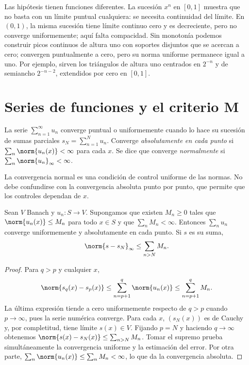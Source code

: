 Las hipótesis tienen funciones diferentes. La sucesión $x^n$ en $[0,1]$ muestra que no basta con un límite puntual cualquiera: se necesita continuidad del límite. En $(0,1)$, la misma sucesión tiene límite continuo cero y es decreciente, pero no converge uniformemente; aquí falta compacidad. Sin monotonía podemos construir picos continuos de altura uno con soportes disjuntos que se acercan a cero; convergen puntualmente a cero, pero su norma uniforme permanece igual a uno. Por ejemplo, sirven los triángulos de altura uno centrados en $2^{-n}$ y de semiancho $2^{-n-2}$, extendidos por cero en $[0,1]$.

\section{Series de funciones y el criterio M}
\begin{definicion}
La serie $\sum_{n=1}^\infty u_n$ converge puntual o uniformemente cuando lo hace su sucesión de sumas parciales $s_N=\sum_{n=1}^N u_n$. Converge \emph{absolutamente en cada punto} si $\sum_n\norm{u_n(x)}<\infty$ para cada $x$. Se dice que converge \emph{normalmente} si $\sum_n\norm{u_n}_\infty<\infty$.
\end{definicion}

La convergencia normal es una condición de control uniforme de las normas. No debe confundirse con la convergencia absoluta punto por punto, que permite que los controles dependan de $x$.

\begin{teorema}\label{ch26:criteriom}\label{ch12:weierstrass}
Sean $V$ Banach y $u_n:S\to V$. Supongamos que existen $M_n\ge0$ tales que $\norm{u_n(x)}\le M_n$ para todo $x\in S$ y que $\sum_n M_n<\infty$. Entonces $\sum_nu_n$ converge uniformemente y absolutamente en cada punto. Si $s$ es su suma,
\[
 \norm{s-s_N}_\infty\le\sum_{n>N}M_n.
\]
\end{teorema}
\begin{proof}
Para $q>p$ y cualquier $x$,
\[
 \norm{s_q(x)-s_p(x)}
 \le\sum_{n=p+1}^q\norm{u_n(x)}\le\sum_{n=p+1}^qM_n.
\]
La última expresión tiende a cero uniformemente respecto de $q>p$ cuando $p\to\infty$, pues la serie numérica converge. Para cada $x$, $(s_N(x))$ es de Cauchy y, por completitud, tiene límite $s(x)\in V$. Fijando $p=N$ y haciendo $q\to\infty$ obtenemos
$\norm{s(x)-s_N(x)}\le\sum_{n>N}M_n$. Tomar el supremo prueba simultáneamente la convergencia uniforme y la estimación del error. Por otra parte, $\sum_n\norm{u_n(x)}\le\sum_nM_n<\infty$, lo que da la convergencia absoluta.
\end{proof}

